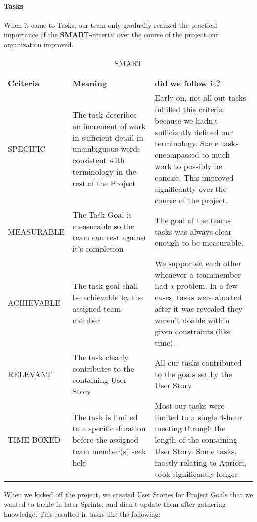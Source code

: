 \paragraph{Tasks} 
When it came to Tasks, our team only gradually realized the practical importance of the \textbf{ SMART}-criteria; over the course of the project our organization improved.


\begin{table}[h!]
  \caption{SMART}
  \label{SMART}
  \centering
  \begin{tabular}{|p{3cm} | p{5cm}| p{5cm}|}
	\hline  	 
  	 Criteria & Meaning & did we follow it? \\ 
  	 \hline
  	 \hline
  	\hfill \break SPECIFIC & 
  	The task describes an increment of work in sufficient detail in unambiguous words consistent with terminology in the rest of the Project & 
  	 Early on, not all out tasks fulfilled this criteria because we hadn't sufficiently defined our terminology. Some tasks encompassed to much work to possibly  be concise. This improved significantly over the course of the project.\\ 
  	\hline
  	\hfill \break MEASURABLE &
  	 The Task Goal is measurable so the team can test against it's completion & The goal of the teams tasks was always clear enough to be measurable. \\ 
  	\hline
  	\hfill \break ACHIEVABLE &
  	 The task goal shall be achievable by the assigned team member &
  	 We supported each other whenever a teammember had a problem. In a few cases, tasks were aborted after it was revealed they weren't doable within given constraints (like time).   \\ 
  	\hline
  	\hfill \break RELEVANT &
  	 The task clearly contributes to the containing User Story & 
  	 All our tasks contributed to the goals set by the User Story   \\ 
  	\hline
  	\hfill \break TIME BOXED &
  	 The task is limited to a specific duration before the assigned team member(s) seek help & Most our tasks were limited to a single 4-hour meeting through the length of the containing User Story. Some tasks, mostly relating to Apriori, took significantly longer. 
  	    \\ 
  	\hline
  	  \end{tabular}
\end{table}

When we kicked off the project, we created User Stories for Project Goals that we wanted to tackle in later Sprints, and didn't update them after gathering knowledge; This resulted in tasks like the following:

